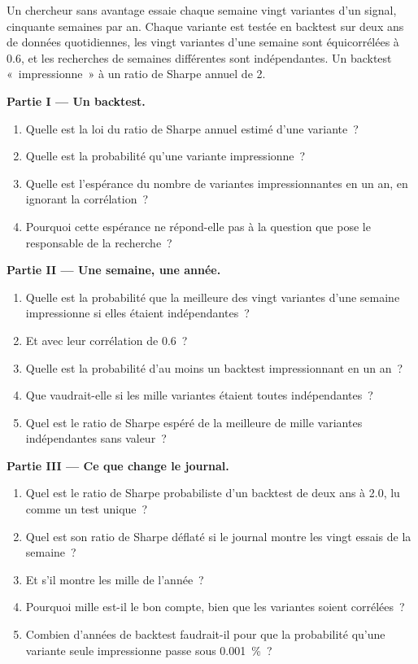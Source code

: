 \begin{problem}\label{pb:rs:the-research-process:1}
Un chercheur sans avantage essaie chaque semaine vingt variantes d'un signal, cinquante semaines par an. Chaque variante est testée en backtest sur deux
ans de données quotidiennes, les vingt variantes d'une semaine sont équicorrélées à 0.6, et les recherches de semaines différentes sont indépendantes. Un
backtest «~impressionne~» à un ratio de Sharpe annuel de 2.

\medskip\noindent\textbf{Partie I --- Un backtest.}
\begin{enumerate}
\item Quelle est la loi du ratio de Sharpe annuel estimé d'une variante~?
\item Quelle est la probabilité qu'une variante impressionne~?
\item Quelle est l'espérance du nombre de variantes impressionnantes en un an, en ignorant la corrélation~?
\item Pourquoi cette espérance ne répond-elle pas à la question que pose le responsable de la recherche~?
\end{enumerate}

\medskip\noindent\textbf{Partie II --- Une semaine, une année.}
\begin{enumerate}[resume]
\item Quelle est la probabilité que la meilleure des vingt variantes d'une semaine impressionne si elles étaient indépendantes~?
\item Et avec leur corrélation de 0.6~?
\item Quelle est la probabilité d'au moins un backtest impressionnant en un an~?
\item Que vaudrait-elle si les mille variantes étaient toutes indépendantes~?
\item Quel est le ratio de Sharpe espéré de la meilleure de mille variantes indépendantes sans valeur~?
\end{enumerate}

\medskip\noindent\textbf{Partie III --- Ce que change le journal.}
\begin{enumerate}[resume]
\item Quel est le ratio de Sharpe probabiliste d'un backtest de deux ans à 2.0, lu comme un test unique~?
\item Quel est son ratio de Sharpe déflaté si le journal montre les vingt essais de la semaine~?
\item Et s'il montre les mille de l'année~?
\item Pourquoi mille est-il le bon compte, bien que les variantes soient corrélées~?
\item Combien d'années de backtest faudrait-il pour que la probabilité qu'une variante seule impressionne passe sous 0.001~\%~?
\end{enumerate}


\end{problem}
